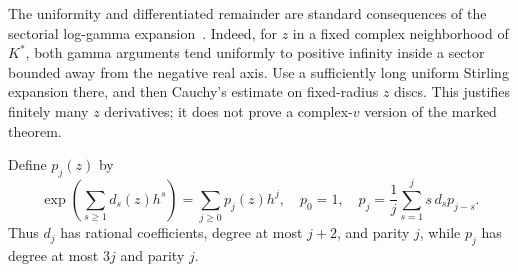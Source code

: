 \documentclass[11pt,letterpaper]{article}
\theoremstyle{remark}\newtheorem{remark}[theorem]{Remark}
\begin{document}
The uniformity and differentiated remainder are standard consequences of the sectorial log-gamma expansion~\cite[\S5.11]{dlmf}. Indeed, for $z$ in a fixed complex neighborhood of $K^*$, both gamma arguments tend uniformly to positive infinity inside a sector bounded away from the negative real axis. Use a sufficiently long uniform Stirling expansion there, and then Cauchy's estimate on fixed-radius $z$ discs. This justifies finitely many $z$ derivatives; it does not prove a complex-$v$ version of the marked theorem.

Define $p_j(z)$ by
\begin{equation}\label{tmm:bal:eq:p}
 \exp\left(\sum_{s\ge1}d_s(z)h^s\right)=\sum_{j\ge0}p_j(z)h^j,
 \quad p_0=1,\quad
 p_j=\frac1j\sum_{s=1}^j s\,d_s p_{j-s}.
\end{equation}
Thus $d_j$ has rational coefficients, degree at most $j+2$, and parity $j$, while $p_j$ has degree at most $3j$ and parity $j$.
\end{document}
